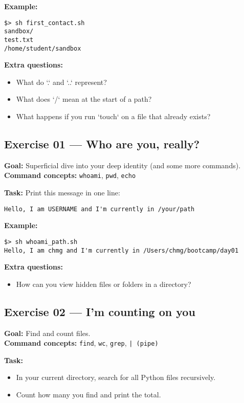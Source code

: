 \documentclass[12pt,a4paper]{article}
\begin{document}
\textbf{Example:}
\begin{lstlisting}
$> sh first_contact.sh
sandbox/
test.txt
/home/student/sandbox
\end{lstlisting}

\textbf{Extra questions:}
\begin{itemize}
  \item What do `.` and `..` represent?
  \item What does `/` mean at the start of a path?
  \item What happens if you run `touch` on a file that already exists?
\end{itemize}

\newpage
\subsection*{Exercise 01 — Who are you, really?}
\textbf{Goal:} Superficial dive into your deep identity (and some more commands).\\
\textbf{Command concepts:} \texttt{whoami}, \texttt{pwd}, \texttt{echo}

\textbf{Task:} Print this message in one line:
\begin{lstlisting}
Hello, I am USERNAME and I'm currently in /your/path
\end{lstlisting}

\textbf{Example:}
\begin{lstlisting}
$> sh whoami_path.sh
Hello, I am chmg and I'm currently in /Users/chmg/bootcamp/day01
\end{lstlisting}

\textbf{Extra questions:}
\begin{itemize}
  \item How can you view hidden files or folders in a directory?
\end{itemize}

\newpage
\subsection*{Exercise 02 — I'm counting on you}
\textbf{Goal:} Find and count files.\\
\textbf{Command concepts:} \texttt{find}, \texttt{wc}, \texttt{grep}, \texttt{| (pipe)}

\textbf{Task:}
\begin{itemize}
  \item In your current directory, search for all Python files recursively.
  \item Count how many you find and print the total.
\end{itemize}
\end{document}
